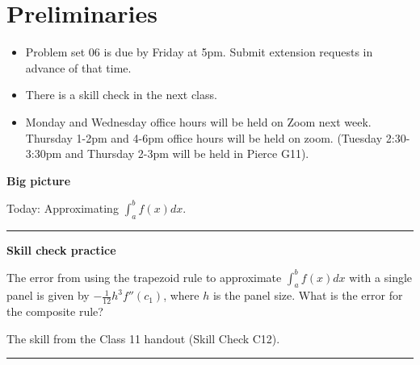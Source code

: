 \documentclass[12pt,letterpaper,noanswers]{exam}
\begin{document}
 \pdfpageheight 11in 
  \pdfpagewidth 8.5in

\noindent 

\section*{Preliminaries}

\begin{itemize}
\itemsep0pt
\item Problem set 06 is due by Friday at 5pm.  Submit extension requests in advance of that time.
\item There is a skill check in the next class.
\item Monday and Wednesday office hours will be held on Zoom next week.  Thursday 1-2pm and 4-6pm office hours will be held on zoom.  (Tuesday 2:30-3:30pm and Thursday 2-3pm will be held in Pierce G11).
\end{itemize}


\noindent\textbf{Big picture}

Today: Approximating $\int_{a}^{b}f(x)dx$.

\vspace{0.2cm}
\hrule
\vspace{0.2cm}

\noindent \textbf{Skill check practice}
\begin{questions}
\item The error from using the trapezoid rule to approximate $\int_a^b f(x)dx$ with a single panel is given by $-\frac{1}{12}h^3f''(c_1)$, where $h$ is the panel size.  What is the error for the composite rule?



\item The skill from the Class 11 handout (Skill Check C12).
\end{questions}


\vspace{0.2cm}
\hrule
\vspace{0.2cm}
\end{document}
